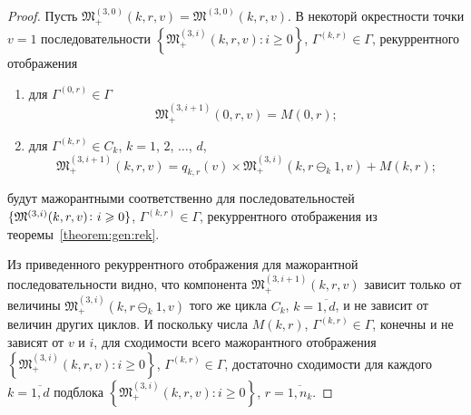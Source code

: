 \documentclass[a4paper,12pt,russian]{extarticle}
\begin{document}
\begin{proof}
Пусть $\mathfrak{M}_+^{(3,0)}(k,r,v) =\mathfrak{M}^{(3,0)}(k,r,v)$. В некоторй окрестности точки  $v = 1$  последовательности $\left\{\mathfrak{M}_+^{(3,i)}(k,r,v)\colon i \geqslant 0\right\}$, $\Gamma^{(k,r)} \in \Gamma$, рекуррентного отображения 
\begin{enumerate}
\item для $ \Gamma^{(0,r)} \in \Gamma$ $$\mathfrak{M}_+^{(3,i+1)}(0,r,v) = M(0,r);$$
\item для $\Gamma^{(k, r)} \in C_{k}$,  $k=1$, $2$, $\dots$, $d$,
$$\mathfrak{M}_+^{(3, i+1)}(k,r,v) = q_{k,r} (v)\times  \mathfrak{M}_+^{(3,i)}(k,r \ominus_{k} 1,v) + M(k,r);$$
\end{enumerate}
будут мажорантными соответственно для последовательностей $\{\mathfrak{M}^{(3,i)}(k,r,v)\colon \hm{} i \geqslant 0\}$, $\Gamma^{(k,r)} \in \Gamma$, рекуррентного отображения из теоремы~\ref{theorem:gen:rek}.

Из приведенного рекуррентного отображения для мажорантной последовательности видно, что компонента $\mathfrak{M}_+^{(3,i+1)}(k,r,v)$ зависит только от величины $\mathfrak{M}_+^{(3,i)}(k,r \ominus_{k} 1,v)$ того же цикла $C_k$, $k=\overline{1,d}$, и не зависит от величин других циклов. И поскольку числа $M(k,r)$, $\Gamma^{(k,r)}\in \Gamma$, конечны и не зависят от $v$ и $i$, для сходимости всего мажорантного отображения $\left\{\mathfrak{M}_+^{(3,i)}(k,r,v)\colon i \geqslant 0\right\}$, $\Gamma^{(k,r)} \in \Gamma$, достаточно сходимости для каждого $k=\overline{1,d}$ подблока $\left\{\mathfrak{M}_+^{(3,i)}(k,r,v)\colon i \geqslant 0\right\}$, $r =\overline{1,n_k}$. 


\end{proof}
\end{document}
